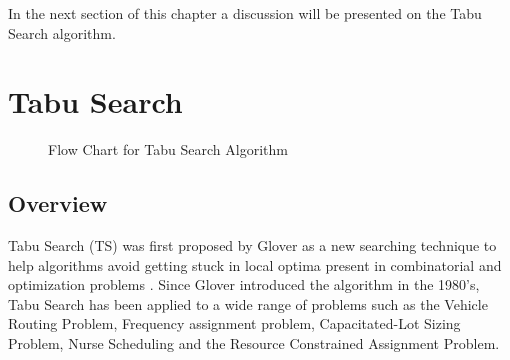 In the next section of this chapter a discussion will be presented on the Tabu Search algorithm.

\section{Tabu Search}
\begin{figure}[p!]
	\begin{center}
	\caption{Flow Chart for Tabu Search Algorithm}
	\label{fig:TSAlgorithmFlowChart}
	\end{center}
\end{figure}
\subsection{Overview}
\label{sec:TSOverview}
Tabu Search (TS) was first proposed by Glover as a new searching technique to help algorithms avoid getting  stuck in local optima present in combinatorial and optimization problems \cite{TabuRCAProblem}. Since Glover introduced the algorithm in the 1980's, Tabu Search has been applied to a wide range of problems such as the Vehicle Routing Problem\cite{TabuVechicleRoutingWithTimeWindows}, Frequency assignment problem\cite{TabuMontemanniSmith}, Capacitated-Lot Sizing Problem\cite{TabuCarryOver}, Nurse Scheduling\cite{TabuNurse} and the Resource Constrained Assignment Problem\cite{TabuRCAProblem}. 

